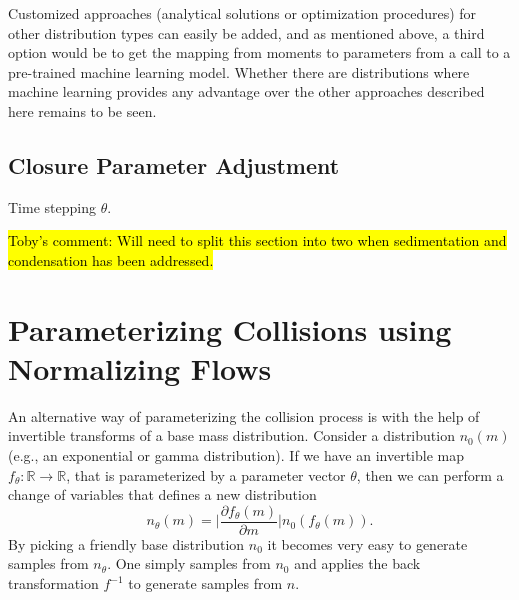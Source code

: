 \documentclass{report}
\begin{document}
Customized approaches (analytical solutions or optimization procedures) for other distribution types can easily be added, and as mentioned above, a third option would be to get the mapping from moments to parameters from a call to a pre-trained machine learning model. Whether there are distributions where machine learning provides any advantage over the other approaches described here remains to be seen.

\subsection{Closure Parameter Adjustment}
Time stepping $\theta$.


\hl{Toby's comment: Will need to split this section into two when sedimentation and condensation has been addressed.}

\section{Parameterizing Collisions using Normalizing Flows}

An alternative way of parameterizing the collision process is with the help of invertible transforms of a base mass distribution. Consider a distribution $n_0(m)$ (e.g., an exponential or gamma distribution). If we have an invertible map $f_\theta:\mathbb{R} \rightarrow \mathbb{R}$, that is parameterized by a parameter vector $\theta$, then we can perform a change of variables that defines a new distribution
\begin{equation}
    \label{eq:normalizing_flow}
    n_\theta(m) = \Big|\frac{\partial f_\theta(m)}{\partial m}\Big| n_0(f_\theta(m)).
\end{equation}
By picking a friendly base distribution $n_0$ it becomes very easy to generate samples from $n_\theta$. One simply samples from $n_0$ and applies the back transformation $f^{-1}$ to generate samples from $n$.
\end{document}

